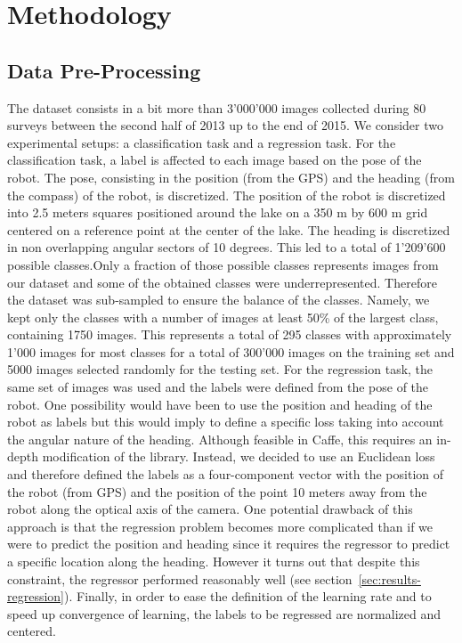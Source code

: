 \section{Methodology}

%

%

\subsection{Data Pre-Processing}


The dataset consists in a bit more than 3'000'000 images collected during 80 surveys between the second half of 2013 up to the end of 2015. We consider two experimental setups: a classification task and a regression task. For the classification task, a label is affected to each image based on the pose of the robot. The pose, consisting in the position (from the GPS) and the heading (from the compass) of the robot, is discretized. The position of the robot is discretized into 2.5 meters squares positioned around the lake on a 350 m by 600 m grid centered on a reference point at the center of the lake. The heading is discretized in non overlapping angular sectors of 10 degrees. This led to a total of 1'209'600 possible classes.Only a fraction of those possible classes represents images from our dataset and some of the obtained classes were underrepresented. Therefore the dataset was sub-sampled to ensure the balance of the classes. Namely, we kept only the classes with a number of images at least 50\% of the largest class, containing 1750 images. This represents a total of 295 classes with approximately 1'000 images for most classes for a total of 300'000 images on the training set  and 5000 images selected randomly for the testing set. For the regression task, the same set of images was used and the labels were defined from the pose of the robot. One possibility would have been to use the position and heading of the robot as labels but this would imply to define a specific loss taking into account the angular nature of the heading.
Although feasible in Caffe, this requires an in-depth modification of the library. Instead, we decided to use an Euclidean loss and therefore defined the labels as a four-component vector with the position of the robot (from GPS) and the position of the point 10 meters away from the robot along the optical axis of the camera. One potential drawback of this approach is that the regression problem becomes more complicated than if we were to predict the position and heading since it requires the regressor to predict a specific location along the heading. However it turns out that despite this constraint, the regressor performed reasonably well (see section~\ref{sec:results-regression}).
Finally, in order to ease the definition of the learning rate and to speed up convergence of learning, the labels to be regressed are normalized and centered.



